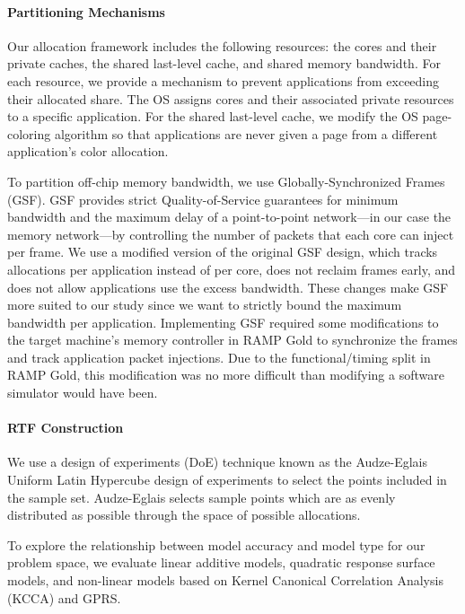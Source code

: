\paragraph*{Partitioning Mechanisms}
Our allocation framework includes the following resources: the cores
and their private caches, the shared last-level cache, and shared
memory bandwidth.  For each resource, we provide a mechanism to
prevent applications from exceeding their allocated share. The OS
assigns cores and their associated private resources to a specific
application. For the shared last-level cache, we modify the OS
page-coloring algorithm so that applications are never given a page
from a different application's color allocation.

To partition off-chip memory bandwidth, we use Globally-Synchronized
Frames (GSF)\cite{gsf}. GSF provides strict Quality-of-Service
guarantees for minimum bandwidth and the maximum delay of a
point-to-point network---in our case the memory network---by
controlling the number of packets that each core can inject per frame.
We use a modified version of the original GSF design, which tracks
allocations per application instead of per core, does not reclaim
frames early, and does not allow applications use the excess
bandwidth.  These changes make GSF more suited to our study since we
want to strictly bound the maximum bandwidth per application.
Implementing GSF required some modifications to the target machine's
memory controller in RAMP Gold to synchronize the frames and track
application packet injections.  Due to the functional/timing split in
RAMP Gold, this modification was no more difficult than modifying a
software simulator would have been.

\paragraph{RTF Construction}

 We use a design of experiments (DoE) technique known as the Audze-Eglais
Uniform Latin Hypercube design of experiments \cite{bates-aes03} to
select the points included in the sample set.  Audze-Eglais selects
sample points which are as evenly distributed as possible through the
space of possible allocations.

To explore the relationship between model accuracy and model type
for our problem space, we evaluate linear additive models, quadratic
response surface models, and non-linear models based on Kernel Canonical Correlation Analysis (KCCA) \cite{kcca} and GPRS.

